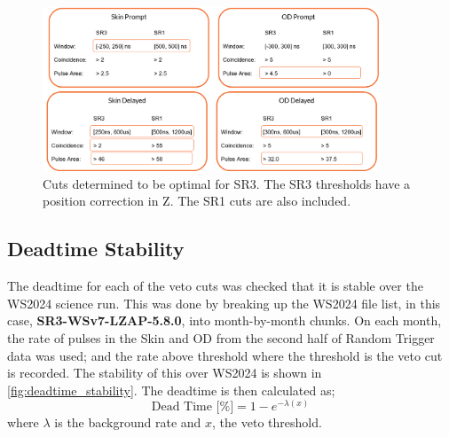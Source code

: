 \begin{figure}
	\centering
	\includegraphics[width=0.9\textwidth]{figures/VetoEfficiency/sr3_cuts.png}
	\caption{Cuts determined to be optimal for SR3.
		The SR3 thresholds have a position correction in Z. The SR1 cuts are also included.}
	\label{fig:sr3_veto_cuts}
\end{figure}

\subsection{Deadtime Stability}
The deadtime for each of the veto cuts was checked that it is stable over the WS2024 science run.
This was done by breaking up the WS2024 file list, in this case, \textbf{SR3-WSv7-LZAP-5.8.0}, into month-by-month chunks.
On each month, the rate of pulses in the Skin and OD from the second half of Random Trigger data was used; and the rate above threshold where the threshold is the veto cut is recorded. 
The stability of this over WS2024 is shown in \autoref{fig:deadtime_stability}.
The deadtime is then calculated as;
\begin{equation}
	\textrm{Dead Time [\%]} = 1 - e^{-\lambda (x)}
\end{equation}
where $\lambda$ is the background rate and $x$, the veto threshold.

